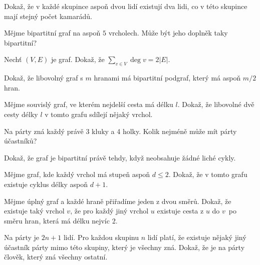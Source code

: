 \uloha
Dokaž, že v každé skupince aspoň dvou lidí existují dva lidi, co v této skupince mají stejný počet kamarádů.
\enduloha


\uloha
Mějme bipartitní graf na aspoň $5$ vrcholech. Může být jeho doplněk taky bipartitní?
\enduloha

\uloha
Nechť $(V, E)$ je graf. Dokaž, že $\sum_{v \in V} \deg v = 2|E|$.
\enduloha

\uloha
Dokaž, že libovolný graf s $m$ hranami má bipartitní podgraf, který má aspoň $m/2$ hran.
\enduloha

\uloha
Mějme souvislý graf, ve kterém nejdelší cesta má délku $l$. Dokaž, že libovolné dvě cesty délky $l$ v tomto grafu sdílejí nějaký vrchol.
\enduloha

\uloha
Na párty zná každý právě 3 kluky a 4 holky. Kolik nejméně může mít párty účastníků?
\enduloha

\uloha
Dokaž, že graf je bipartitní právě tehdy, když neobsahuje žádné liché cykly.
\enduloha

\uloha
Mějme graf, kde každý vrchol má stupeň aspoň $d \leq 2$. Dokaž, že v tomto grafu existuje cyklus délky aspoň $d + 1$.
\enduloha

\uloha
Mějme úplný graf a každé hraně přiřadíme jeden z dvou směrů. Dokaž, že existuje taký vrchol $v$, že pro každý jiný vrchol $u$ existuje cesta z $u$ do $v$ po směru hran, která má délku nejvíc 2.
\enduloha

\uloha
Na párty je $2n + 1$ lidí. Pro každou skupinu $n$ lidí platí, že existuje nějaký jiný účastník párty mimo této skupiny, který je všechny zná. Dokaž, že je na párty člověk, který zná všechny ostatní.
\enduloha
